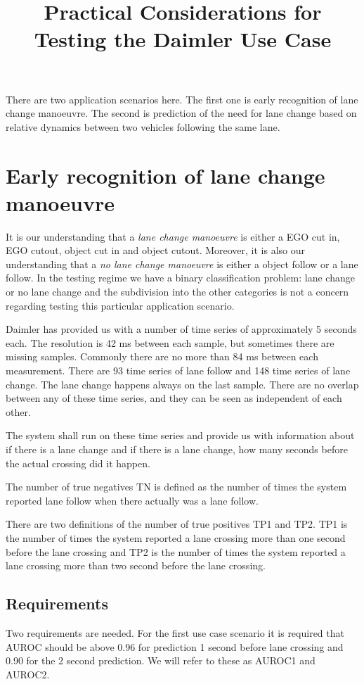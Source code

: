 \documentclass{article}
\title{Practical Considerations for Testing the Daimler Use Case}
\date{}
\theoremstyle{theorem}
\theoremstyle{definition}
\begin{document}
\maketitle

There are two application scenarios here.  The first one is early recognition of lane change manoeuvre. The second is prediction of the need for lane change based on relative dynamics between two vehicles following the same lane.

\section{Early recognition of lane change manoeuvre}

It is our understanding that a \emph{lane change manoeuvre} is either a EGO cut in, EGO cutout, object cut in and object cutout.  Moreover, it is also our understanding that a \emph{no lane change manoeuvre} is either a object follow or a lane follow.  In the testing regime we have a binary classification problem: lane change or no lane change and the subdivision  into the other categories is not a concern regarding testing this particular application scenario.

Daimler has provided us with a number of time series of approximately 5 seconds each.  The resolution is 42 ms between each sample, but sometimes there are missing samples.  Commonly there are no more than 84 ms between each measurement.  There are 93 time series of lane follow and 148 time series of lane change.  The lane change happens always on the last sample. There are no overlap between any of these time series, and they can be seen as independent of each other.

The system shall run on these time series and provide us with information about if there is a lane change and if there is a lane change, how many seconds before the actual crossing did it happen.

The number of true negatives TN is defined as the number of times the system reported lane follow when there actually was a lane follow. 

There are two definitions of the number of true positives TP1 and TP2.  TP1 is the number of times the system reported a lane crossing more than one second before the lane crossing and TP2 is the number of times the system reported a lane crossing more than two second before the lane crossing.

\subsection*{Requirements}
Two requirements are needed.  For the first use case scenario it is required that AUROC should be above 0.96 for prediction 1 second before lane crossing and 0.90 for the 2 second prediction.  We will refer to these as AUROC1 and AUROC2.  
\end{document}
